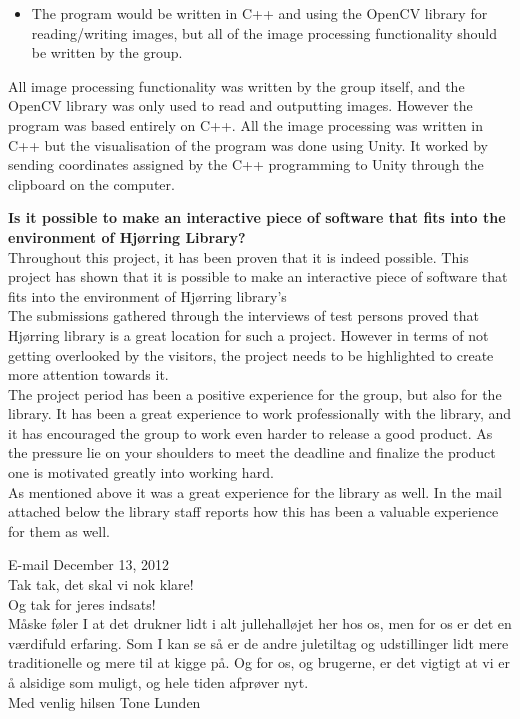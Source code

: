 \begin{itemize}
\item The program would be written in C++ and using the OpenCV library for reading/writing images, but all of the image processing functionality should be written by the group.
\end{itemize}
All image processing functionality was written by the group itself, and the OpenCV library was only used to read and outputting images. However the program was based entirely on C++. All the image processing was written in C++ but the visualisation of the program was done using Unity. It worked by sending coordinates assigned by the C++ programming to Unity through the clipboard on the computer.

\textbf{Is it possible to make an interactive piece of software that fits into the environment of Hj{\o}rring Library?}\\
Throughout this project, it has been proven that it is indeed possible. This project has shown that it is possible to make an interactive piece of software that fits into the environment of Hj{\o}rring library's\\
The submissions gathered through the interviews of test persons proved that Hj{\o}rring library is a great location for such a project. However in terms of not getting overlooked by the visitors, the project needs to be highlighted to create more attention towards it.\\
The project period has been a positive experience for the group, but also for the library. It has been a great experience to work professionally with the library, and it has encouraged the group to work even harder to release a good product. As the pressure lie on your shoulders to meet the deadline and finalize the product one is motivated greatly into working hard.\\
As mentioned above it was a great experience for the library as well. In the mail attached below the library staff reports how this has been a valuable experience for them as well.

\begin{fancyquotes}
E-mail December 13, 2012\\
Tak tak, det skal vi nok klare!\\
Og tak for jeres indsats!\\
M{\aa}ske f{\o}ler I at det drukner lidt i alt jullehall{\o}jet her hos os, men for os er det en v{\ae}rdifuld erfaring. Som I kan se s{\aa} er de andre juletiltag og udstillinger lidt mere traditionelle og mere til at kigge p{\aa}. Og for os, og brugerne, er det vigtigt at vi er {\aa} alsidige som muligt, og hele tiden afpr{\o}ver nyt.\\
Med venlig hilsen
Tone Lunden
\end{fancyquotes}



